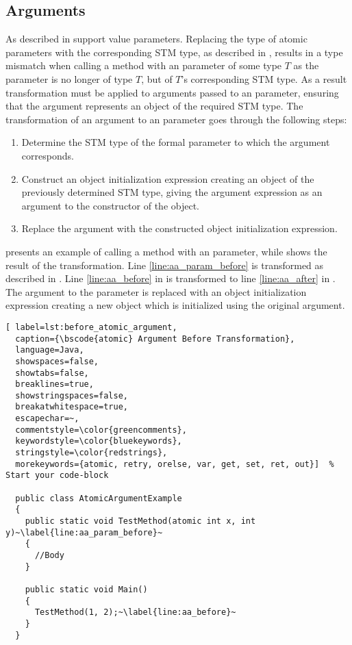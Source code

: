 \subsection{Arguments}
As described in  \stmnamesp support value parameters. Replacing the type of atomic parameters with the corresponding \ac{STM} type, as described in , results in a type mismatch when calling a method with an  parameter of some type $T$ as the parameter is no longer of type $T$, but of $T$'s corresponding \ac{STM} type. As a result transformation must be applied to arguments passed to an  parameter, ensuring that the argument represents an object of the required \ac{STM} type. The transformation of an argument to an  parameter goes through the following steps:

\begin{enumerate}
	\item Determine the \ac{STM} type of the formal parameter to which the argument corresponds.
	\item Construct an object initialization expression creating an object of the previously determined \ac{STM} type, giving the argument expression as an argument to the constructor of the object.
	\item Replace the argument with the constructed object initialization expression.
\end{enumerate}

 presents an example of calling a method with an  parameter, while  shows the result of the transformation. Line \ref{line:aa_param_before} is transformed as described in . Line \ref{line:aa_before} in  is transformed to line \ref{line:aa_after} in . The argument to the  parameter is replaced with an object initialization expression creating a new  object which is initialized using the original argument.


\begin{lstlisting}[ label=lst:before_atomic_argument,
  caption={\bscode{atomic} Argument Before Transformation},
  language=Java,  
  showspaces=false,
  showtabs=false,
  breaklines=true,
  showstringspaces=false,
  breakatwhitespace=true,
  escapechar=~,
  commentstyle=\color{greencomments},
  keywordstyle=\color{bluekeywords},
  stringstyle=\color{redstrings},
  morekeywords={atomic, retry, orelse, var, get, set, ret, out}]  % Start your code-block

  public class AtomicArgumentExample
  {
    public static void TestMethod(atomic int x, int y)~\label{line:aa_param_before}~
    {
      //Body
    }

    public static void Main()
    {
      TestMethod(1, 2);~\label{line:aa_before}~
    }
  }
\end{lstlisting}

